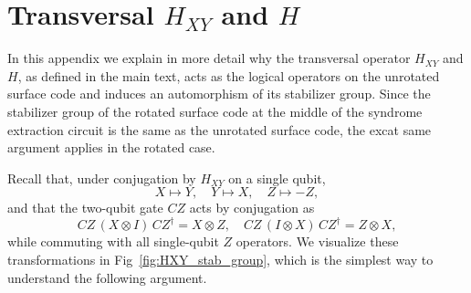 \documentclass[twocolumn,notitlepage,nofootinbib,floatfix,superscriptaddress]{revtex4-1}
\begin{document}




\section{Transversal \texorpdfstring{$H_{XY}$}{HXY} and $H$}
\label{app:transversal_HXY}

In this appendix we explain in more detail why the transversal operator $H_{XY}$ and $H$, as defined in the main text, acts as the logical operators on the unrotated surface code and induces an automorphism of its stabilizer group. Since the stabilizer group of the rotated surface code at the middle of the syndrome extraction circuit \cite{chen2024transversal} is the same as the unrotated surface code, the excat same argument applies in the rotated case.

Recall that, under conjugation by $H_{XY}$ on a single qubit,  
\[
X\mapsto Y,\quad  
 Y \mapsto X,\quad  
Z\mapsto -Z,
\]
and that the two-qubit gate $CZ$ acts by conjugation as
\[
CZ\,(X\otimes I)\,CZ^\dagger = X\otimes Z,\quad
CZ\,(I\otimes X)\,CZ^\dagger = Z\otimes X,
\]
while commuting with all single-qubit $Z$ operators. We visualize these transformations in Fig~\ref{fig:HXY_stab_group}, which is the simplest way to understand the following argument.
\end{document}

